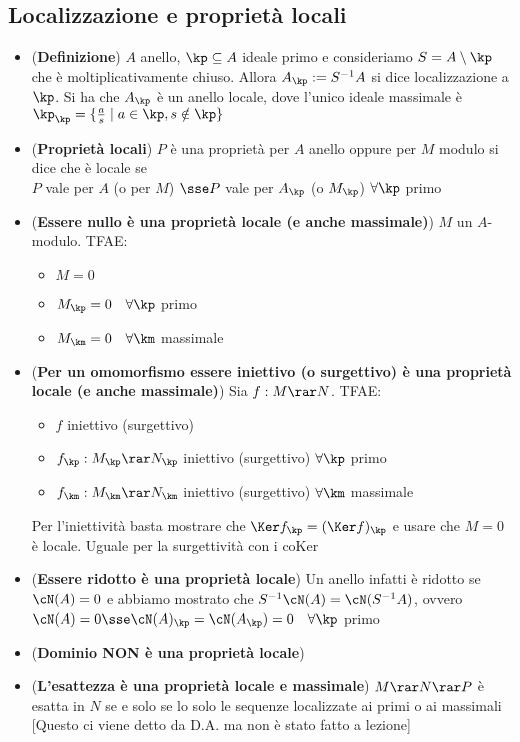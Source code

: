 \documentclass[a4paper,NoNotes,GeneralMath]{stdmdoc}
\newcommand{\coKer}{\text{coKer }}
\begin{document}
	\subsection*{Localizzazione e proprietà locali}
	\begin{itemize}
		\item ({\bf Definizione}) $A$ anello, $\kp \subseteq A$ ideale primo e consideriamo $S = A \setminus \kp$ che è moltiplicativamente chiuso. Allora $A_\kp := S^{-1}A$ si dice localizzazione a $\kp$. Si ha che $A_\kp$ è un anello locale, dove l'unico ideale massimale è $\kp_\kp = \{ \frac{a}{s} \mid a \in \kp, s \notin \kp \}$
		\item ({\bf Proprietà locali}) $P$ è una proprietà per $A$ anello oppure per $M$ modulo si dice che è locale se \\
			$P$ vale per $A$ (o per $M$) $\sse P$ vale per $A_\kp$ (o $M_\kp$) $\forall \kp$ primo
		\item ({\bf Essere nullo è una proprietà locale (e anche massimale)}) $M$ un $A$-modulo. TFAE:
			\begin{itemize}
				\item $M = 0$
				\item $M_\kp = 0 \quad \forall \kp$ primo
				\item $M_\km = 0 \quad \forall \km$ massimale
			\end{itemize}
		\item ({\bf Per un omomorfismo essere iniettivo (o surgettivo) è una proprietà locale (e anche massimale)}) Sia $f: M \rar N$. TFAE:
			\begin{itemize}
				\item $f$ iniettivo (surgettivo)
				\item $f_\kp: M_\kp \rar N_\kp$ iniettivo (surgettivo) $\forall \kp$ primo
				\item $f_\km: M_\km \rar N_\km$ iniettivo (surgettivo) $\forall \km$ massimale
			\end{itemize}
			Per l'iniettività basta mostrare che $\Ker f_\kp = (\Ker f)_\kp$ e usare che $M = 0$ è locale. Uguale per la surgettività con i $\coKer$
		\item ({\bf Essere ridotto è una proprietà locale}) Un anello infatti è ridotto se $\cN(A) = 0$ e abbiamo mostrato che $S^{-1}\cN(A) = \cN(S^{-1}A)$, ovvero $\cN(A) = 0 \sse \cN(A)_\kp = \cN(A_\kp) = 0 \quad \forall \kp$ primo
		\item ({\bf Dominio NON è una proprietà locale})
		\item ({\bf L'esattezza è una proprietà locale e massimale}) $M \rar N \rar P$ è esatta in $N$ se e solo se lo solo le sequenze localizzate ai primi o ai massimali [Questo ci viene detto da D.A. ma non è stato fatto a lezione]
	\end{itemize}
	
\end{document}
